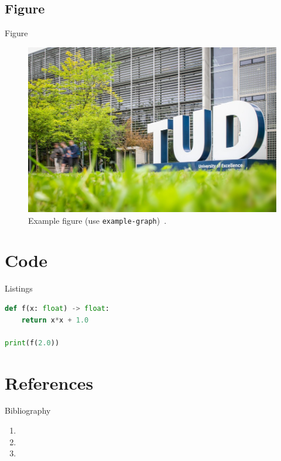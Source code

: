 \documentclass[aspectratio=169, xcolor=table]{beamer}
\begin{document}
\subsection{Figure}
\begin{frame}{Figure}
  \begin{figure}
    \centering
    \includegraphics[width=.62\linewidth]{example-graph}
    \caption{Example figure (use \texttt{example-graph})~\cite{clarke1964}.}
  \end{figure}
\end{frame}

\section{Code}
\begin{frame}[fragile]{Listings}
\begin{lstlisting}[language=Python,caption={Simple Python snippet}]
def f(x: float) -> float:
    return x*x + 1.0

print(f(2.0))
\end{lstlisting}
\end{frame}

\section{References}
\begin{frame}[allowframebreaks]{Bibliography}
  \footnotesize
  \begin{enumerate}
    \item {}
    \item {}
    \item {}
  \end{enumerate}
\end{frame}
\end{document}
